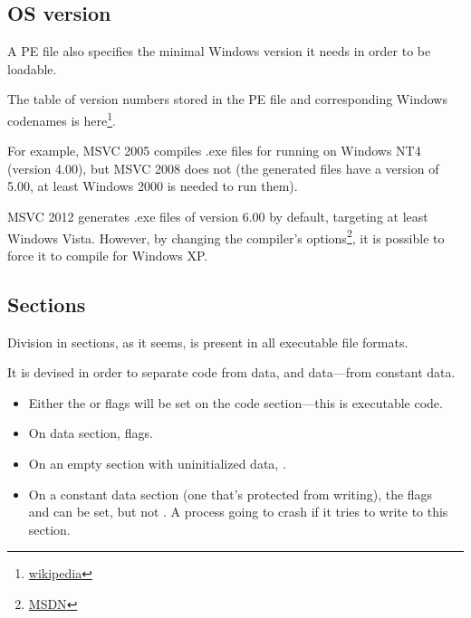\subsection{OS version}

A PE file also specifies the minimal Windows version it needs in order to be loadable.

The table of version numbers stored in the PE file and corresponding Windows codenames is
here\footnote{\href{http://go.yurichev.com/17044}{wikipedia}}.

For example, \ac{MSVC} 2005 compiles .exe files for running on Windows NT4 (version 4.00), but \ac{MSVC} 2008 does not 
(the generated files have a version of 5.00, at least Windows 2000 is needed to run them).


\ac{MSVC} 2012 generates .exe files of version 6.00 by default, 
targeting at least Windows Vista. 
However, by changing the compiler's options\footnote{\href{http://go.yurichev.com/17045}{MSDN}},
it is possible to force it to compile for Windows XP.

\subsection{Sections}

Division in sections, as it seems, is present in all executable file formats.

It is devised in order to separate code from data, and data---from constant data.

\begin{itemize}
\item Either the  or  flags will be set on the code section---this is executable code.

\item On data section\EMDASH{}, 
 \AndENRU {} flags.

\item On an empty section with uninitialized 
data\EMDASH{},  \AndENRU {}.

\item On a constant data section (one that's protected from writing), the flags \\
 and  can be set, but not . 
A process going to crash if it tries to write to this section.
\end{itemize}

